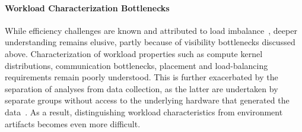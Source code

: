 \paragraph{Workload Characterization Bottlenecks}
While efficiency challenges are known and attributed to load
imbalance~\cite{Dubey2014:Survey,Burst2008:ALPS,Klenk2017:OverviewMPICharacteristics}, deeper
understanding remains elusive, partly because of visibility bottlenecks discussed above.
Characterization of workload properties such as compute kernel distributions, communication
bottlenecks, placement and load-balancing requirements remain poorly understood.
This is further exacerbated by the separation of analyses from data collection, as the latter are
undertaken by separate groups without access to the underlying hardware that generated the
data~\cite{:DOEProxyApps}.
As a result, distinguishing workload characteristics from environment artifacts becomes even more
difficult.


